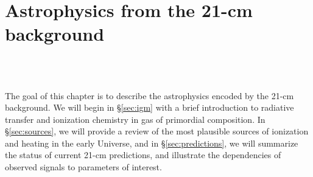 

\chapter{Astrophysics from the 21-cm background}

\begin{bf}
  \author{Jordan Mirocha}\\
\\
\end{bf}

The goal of this chapter is to describe the astrophysics encoded by the 21-cm background. We will begin in \S\ref{sec:igm} with a brief introduction to radiative transfer and ionization chemistry in gas of primordial composition. In \S\ref{sec:sources}, we will provide a review of the most plausible sources of ionization and heating in the early Universe, and in \S\ref{sec:predictions}, we will summarize the status of current 21-cm predictions, and illustrate the dependencies of observed signals to parameters of interest.

%
%


